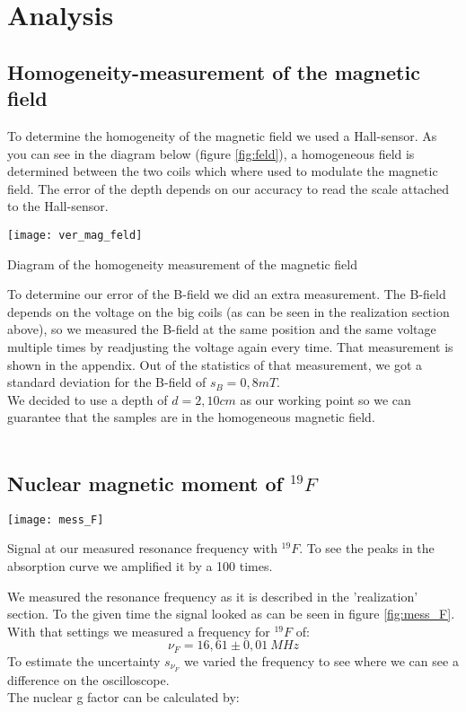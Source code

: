 \section{Analysis}
\subsection{Homogeneity-measurement of the magnetic field}
To determine the homogeneity of the magnetic field we used a Hall-sensor. As you can see in the diagram below (figure \ref{fig:feld}), a homogeneous field is determined between the two coils which where used to modulate the magnetic field. The error of the depth depends on our accuracy to read the scale attached to the Hall-sensor. 
\begin{floatingfigure}[l]{11cm}
\begin{center}
\texttt{[image: ver\_mag\_feld]}
\caption{Diagram of the homogeneity measurement of the magnetic field}
\label{fig:feld}
\end{center}
\end{floatingfigure}
To determine our error of the B-field we did an extra measurement. The B-field depends on the voltage on the big coils (as can be seen in the realization section above), so we measured the B-field at the same position and the same voltage multiple times by readjusting the voltage again every time. That measurement is shown in the appendix. Out of the statistics of that measurement, we got a standard deviation for the B-field of $s_B=0,8mT$.\\
We decided to use a depth of $d=2,10 cm$ as our working point so we can guarantee that the samples are in the homogeneous magnetic field.\\
~\\

\subsection{Nuclear magnetic moment of $^{19}F$}

\begin{floatingfigure}[r]{8cm}
\texttt{[image: mess\_F]}
\caption{Signal at our measured resonance frequency with $^{19}F$. To see the peaks in the absorption curve we amplified it by a 100 times.}
\label{fig:mess_F}
\end{floatingfigure}
We measured the resonance frequency as it is described in the 'realization' section. To the given time the signal looked as can be seen in figure \ref{fig:mess_F}. With that settings we measured a frequency for $^{19}F$ of:
\[ \nu_F = 16,61 \pm 0,01 ~ MHz \]
To estimate the uncertainty $s_{\nu_{F}}$ we varied the frequency to see where we can see a difference on the oscilloscope.\\
The nuclear g factor can be calculated by:

